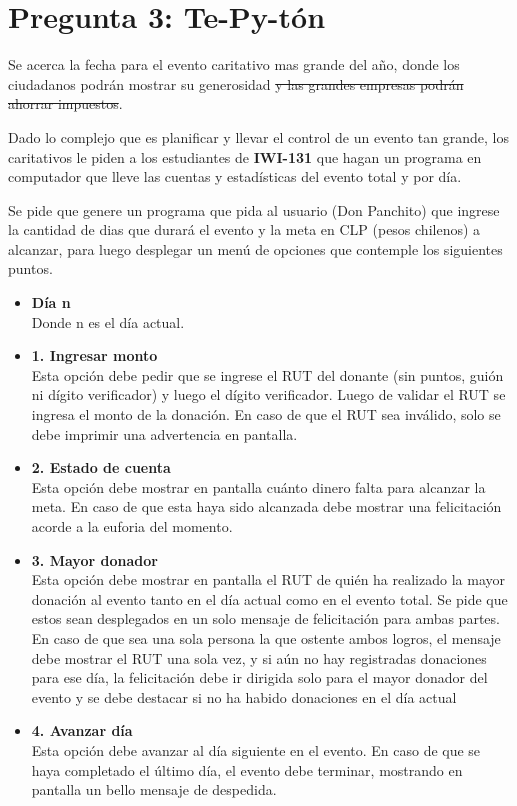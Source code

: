 \section*{\textbf{Pregunta 3:} Te-Py-tón}
Se acerca la fecha para el evento caritativo mas grande del año, donde los ciudadanos podrán mostrar su generosidad \sout{y las grandes empresas podrán ahorrar impuestos}.\par
Dado lo complejo que es planificar y llevar el control de un evento tan grande, los caritativos le piden a los estudiantes de \textbf{IWI-131} que hagan un programa en computador que lleve las cuentas y estadísticas del evento total y por día.\par 
Se pide que genere un programa que pida al usuario (Don Panchito) que ingrese la cantidad de dias que durará el evento y la meta en CLP (pesos chilenos) a alcanzar, para luego desplegar un menú de opciones que contemple los siguientes puntos.\par

\begin{itemize}
    \item \textbf{Día n}\\
    Donde n es el día actual.
    \item \textbf{1. Ingresar monto}\\
    Esta opción debe pedir que se ingrese el RUT del donante (sin puntos, guión ni dígito verificador) y luego el dígito verificador. Luego de validar el RUT se ingresa el monto de la donación.
    En caso de que el RUT sea inválido, solo se debe imprimir una advertencia en pantalla.
    \item \textbf{2. Estado de cuenta}\\
    Esta opción debe mostrar en pantalla cuánto dinero falta para alcanzar la meta. En caso de que esta haya sido alcanzada debe mostrar una felicitación acorde a la euforia del momento.
    \item \textbf{3. Mayor donador}\\
    Esta opción debe mostrar en pantalla el RUT de quién ha realizado la mayor donación al evento tanto en el día actual como en el evento total. Se pide que estos sean desplegados en un solo mensaje de felicitación para ambas partes. En caso de que sea una sola persona la que ostente ambos logros, el mensaje debe mostrar el RUT una sola vez, y si aún no hay registradas donaciones para ese día, la felicitación debe ir dirigida solo para el mayor donador del evento y se debe destacar si no ha habido donaciones en el día actual
    \item \textbf{4. Avanzar día}\\
    Esta opción debe avanzar al día siguiente en el evento. En caso de que se haya completado el último día, el evento debe terminar, mostrando en pantalla un bello mensaje de despedida.
\end{itemize}

